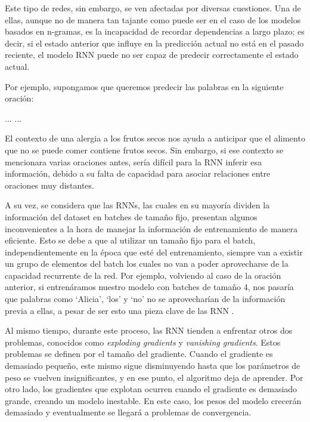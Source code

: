 Este tipo de redes, sin embargo, se ven afectadas por diversas cuestiones. Una de ellas, aunque no de manera tan tajante como puede ser en el caso de los modelos basados en n-gramas, es la incapacidad de recordar dependencias a largo plazo; es decir, si el estado anterior que influye en la predicción actual no está en el pasado reciente, el modelo RNN puede no ser capaz de predecir correctamente el estado actual.

Por ejemplo, supongamos que queremos predecir las palabras en la siguiente oración:

\begin{center}
    ...  ...
\end{center}

El contexto de una alergia a los frutos secos nos ayuda a anticipar que el alimento que no se puede comer contiene frutos secos. Sin embargo, si ese contexto se mencionara varias oraciones antes, sería difícil para la RNN inferir esa información, debido a su falta de capacidad para asociar relaciones entre oraciones muy distantes.

A su vez, se considera que las RNNs, las cuales en su mayoría dividen la información del dataset en batches de tamaño fijo,  presentan algunos inconvenientes a la hora de manejar la información de entrenamiento de manera eficiente. Esto se debe a que al utilizar un tamaño fijo para el batch, independientemente en la época que esté del entrenamiento, siempre van a existir un grupo de elementos del batch los cuales no van a poder aprovecharse de la capacidad recurrente de la red. Por ejemplo, volviendo al caso de la oración anterior, si entrenáramos nuestro modelo con batches de tamaño 4, nos pasaría que palabras como ‘Alicia’, ‘los’ y ‘no’ no se aprovecharían de la información previa a ellas, a pesar de ser esto una pieza clave de las RNN \parencite{merity2017regularizingoptimizinglstmlanguage}.

Al mismo tiempo, durante este proceso, las RNN tienden a enfrentar otros dos problemas, conocidos como \textit{exploding gradients} y \textit{vanishing gradients}. Estos problemas se definen por el tamaño del gradiente. Cuando el gradiente es demasiado pequeño, este mismo sigue disminuyendo hasta que los parámetros de peso se vuelven insignificantes, y en ese punto, el algoritmo deja de aprender. Por otro lado, los gradientes que explotan ocurren cuando el gradiente es demasiado grande, creando un modelo inestable. En este caso, los pesos del modelo crecerán demasiado y eventualmente se llegará a problemas de convergencia.

